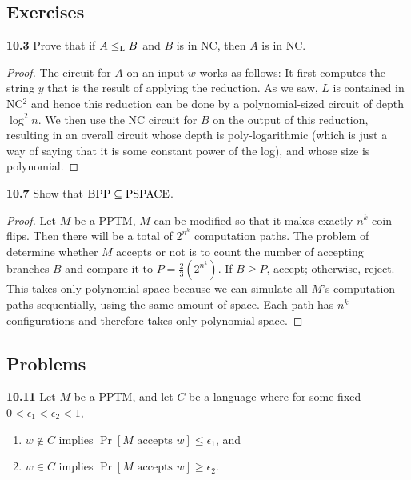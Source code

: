 \subsection{Exercises}

\textbf{10.3} Prove that if $A \leq_{\text{L}} B$ and $B$ is in NC, then $A$ is in NC.
\begin{mdframed}
\begin{proof}
The circuit for $A$ on an input $w$ works as follows: It first computes the string $y$ that is the result of applying the reduction. As we saw, $L$ is contained in NC$^2$ and hence this reduction can be done by a polynomial-sized circuit of depth $\log^2 n$. We then use the NC circuit for $B$ on the output of this reduction, resulting in an overall circuit whose depth is poly-logarithmic (which is just a way of saying that it is some constant power of the log), and whose size is polynomial.
\end{proof}
\end{mdframed}

\textbf{10.7} Show that $\text{BPP} \subseteq \text{PSPACE}$.

\begin{mdframed}
\begin{proof}
Let $M$ be a PPTM, $M$ can be modified so that it makes exactly $n^k$ coin flips. Then there will be a total of $2^{n^k}$ computation paths. The problem of determine whether $M$ accepts or not is to count the number of accepting branches $B$ and compare it to $P = \frac{2}{3}(2^{n^k})$. If $B \geq P$, accept; otherwise, reject. This takes only polynomial space because we can simulate all $M$'s computation paths sequentially, using the same amount of space. Each path has $n^k$ configurations and therefore takes only polynomial space.
\end{proof}
\end{mdframed}

\subsection{Problems}

\textbf{10.11} Let $M$ be a PPTM, and let $C$ be a language where for some fixed $0 < \epsilon_1 < \epsilon_2 < 1$, 
\begin{enumerate}
\item $w \not \in C$ implies $\Pr[M \text{ accepts } w] \leq \epsilon_1$, and
\item $w \in C$ implies $\Pr[M \text{ accepts } w] \geq \epsilon_2$.
\end{enumerate}

